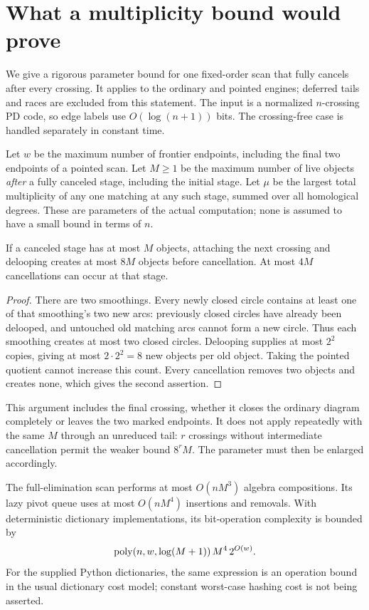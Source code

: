 \section{What a multiplicity bound would prove}
\label{sec:parameters}

We give a rigorous parameter bound for one fixed-order scan that fully
cancels after every crossing.  It applies to the ordinary and pointed
engines; deferred tails and races are excluded from this statement.  The
input is a normalized $n$-crossing PD code, so edge labels use $O(\log(n+1))$
bits.  The crossing-free case is handled separately in constant time.

Let $w$ be the maximum number of frontier endpoints, including the final
two endpoints of a pointed scan.  Let $M\geq1$ be the maximum number of live
objects \emph{after} a fully canceled stage, including the initial stage.
Let $\mu$ be the largest total multiplicity of any one matching at any such
stage, summed over all homological degrees.  These are parameters of the
actual computation; none is assumed to have a small bound in terms of $n$.

\begin{lemma}
\label{lem:eightfold}
If a canceled stage has at most $M$ objects, attaching the next crossing and
delooping creates at most $8M$ objects before cancellation.  At most $4M$
cancellations can occur at that stage.
\end{lemma}

\begin{proof}
There are two smoothings.  Every newly closed circle contains at least one
of that smoothing's two new arcs: previously closed circles have already
been delooped, and untouched old matching arcs cannot form a new circle.
Thus each smoothing creates at most two closed circles.  Delooping supplies
at most $2^2$ copies, giving at most $2\cdot2^2=8$ new objects per old object.
Taking the pointed quotient cannot increase this count.  Every cancellation
removes two objects and creates none, which gives the second assertion.
\end{proof}

This argument includes the final crossing, whether it closes the ordinary
diagram completely or leaves the two marked endpoints.  It does not apply
repeatedly with the same $M$ through an unreduced tail: $r$ crossings without
intermediate cancellation permit the weaker bound $8^rM$.  The parameter
must then be enlarged accordingly.

\begin{proposition}
\label{prop:retainedbound}
The full-elimination scan performs at most $O(nM^3)$ algebra compositions.
Its lazy pivot queue uses at most $O(nM^4)$ insertions and removals.  With
deterministic dictionary implementations, its bit-operation complexity is
bounded by
\begin{equation}
 \operatorname{poly}(n,w,\log(M+1))\,M^4\,2^{O(w)}.
 \label{eq:retainedbound}
\end{equation}
For the supplied Python dictionaries, the same expression is an operation
bound in the usual dictionary cost model; constant worst-case hashing cost
is not being asserted.
\end{proposition}

